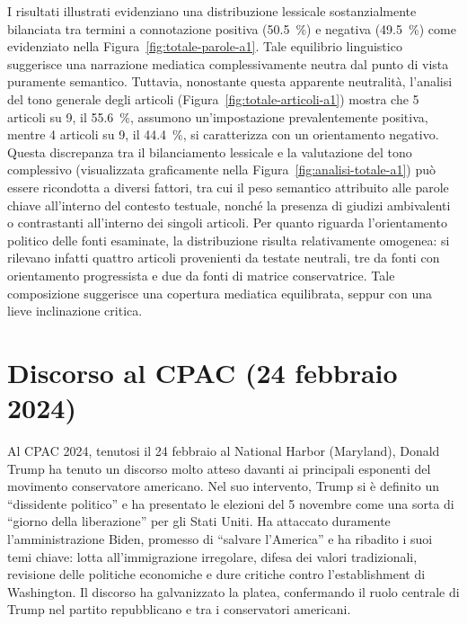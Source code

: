 I risultati illustrati evidenziano una distribuzione lessicale sostanzialmente bilanciata tra termini a connotazione positiva (\SI{50.5}{\percent}) e negativa (\SI{49.5}{\percent}) come evidenziato nella Figura~\ref{fig:totale-parole-a1}. Tale equilibrio linguistico suggerisce una narrazione mediatica complessivamente neutra dal punto di vista puramente semantico. Tuttavia, nonostante questa apparente neutralità, l'analisi del tono generale degli articoli (Figura~\ref{fig:totale-articoli-a1}) mostra che 5 articoli su 9, il \SI{55.6}{\percent}, assumono un'impostazione prevalentemente positiva, mentre 4 articoli su 9, il \SI{44.4}{\percent}, si caratterizza con un orientamento negativo.
Questa discrepanza tra il bilanciamento lessicale e la valutazione del tono complessivo (visualizzata graficamente nella Figura~\ref{fig:analisi-totale-a1}) può essere ricondotta a diversi fattori, tra cui il peso semantico attribuito alle parole chiave all'interno del contesto testuale, nonché la presenza di giudizi ambivalenti o contrastanti all'interno dei singoli articoli.
Per quanto riguarda l'orientamento politico delle fonti esaminate, la distribuzione risulta relativamente omogenea: si rilevano infatti quattro articoli provenienti da testate neutrali, tre da fonti con orientamento progressista e due da fonti di matrice conservatrice. Tale composizione suggerisce una copertura mediatica equilibrata, seppur con una lieve inclinazione critica.

\newpage
\section{Discorso al CPAC (24 febbraio 2024)}

Al CPAC 2024, tenutosi il 24 febbraio al National Harbor (Maryland), Donald Trump ha tenuto un discorso molto atteso davanti ai principali esponenti del movimento conservatore americano.
Nel suo intervento, Trump si è definito un “dissidente politico” e ha presentato le elezioni del 5 novembre come una sorta di “giorno della liberazione” per gli Stati Uniti.
Ha attaccato duramente l’amministrazione Biden, promesso di “salvare l’America” e ha ribadito i suoi temi chiave: lotta all’immigrazione irregolare, difesa dei valori tradizionali, revisione delle politiche economiche e dure critiche contro l’establishment di Washington.
Il discorso ha galvanizzato la platea, confermando il ruolo centrale di Trump nel partito repubblicano e tra i conservatori americani. \\

